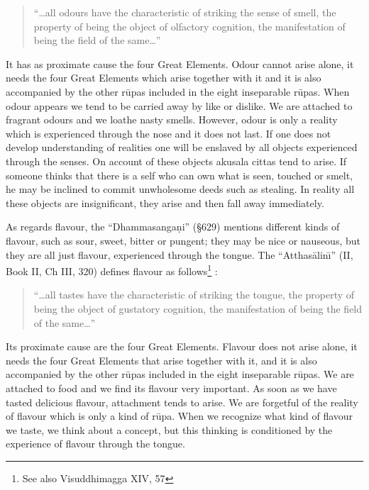 \documentclass{book}
\begin{document}
\begin{quote}\begin{flushleft}
``\ldots all odours have the characteristic of striking the sense of smell, the property of being the object of olfactory cognition, the
manifestation of being the field of the same\ldots''
\end{flushleft}\end{quote}


It has as proximate cause the four Great Elements. Odour cannot arise
alone, it needs the four Great Elements which arise together with it
and it is also accompanied by the other r\=upas included in the eight
inseparable r\=upas. When odour appears we tend to be carried away by
like or dislike. We are attached to fragrant odours and we loathe nasty
smells. However, odour is only a reality which is experienced through
the nose and it does not last. If one does not develop understanding of
realities one will be enslaved by all objects experienced through the
senses. On account of these objects akusala cittas tend to arise. If
someone thinks that there is a self who can own what is seen, touched
or smelt, he may be inclined to commit unwholesome deeds such as
stealing. In reality all these objects are insignificant, they arise
and then fall away immediately. 

As regards flavour, the ``Dhamma\-sanga\d ni'' ({\S}629) mentions
different kinds of flavour, such as sour, sweet, bitter or pungent;
they may be nice or nauseous, but they are all just flavour,
experienced through the tongue. The ``Atthas{\=a}lin\=\i''
(II, Book II, Ch III, 320) defines flavour as follows\footnote{See
also Visuddhimagga XIV, 57} : 




\begin{quote}\begin{flushleft}
``\ldots all tastes have the characteristic of striking the tongue, the
property of being the object of gustatory cognition, the manifestation
of being the field of the same\ldots''
\end{flushleft}\end{quote}




Its proximate cause are the four Great Elements. Flavour does not arise
alone, it needs the four Great Elements that arise together with it,
and it is also accompanied by the other r\=upas included in the eight
inseparable r\=upas. We are attached to food and we find its flavour
very important. As soon as we have tasted delicious flavour, attachment
tends to arise. We are forgetful of the reality of flavour which is
only a kind of r\=upa. When we recognize what kind of flavour we taste,
we think about a concept, but this thinking is conditioned by the
experience of flavour through the tongue.
\end{document}
